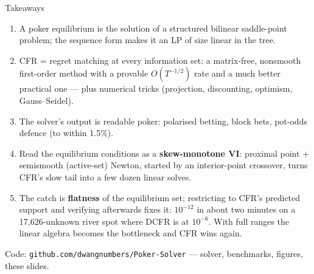\documentclass[10pt,aspectratio=169]{beamer}
\begin{document}
\begin{frame}{Takeaways}
\begin{enumerate}\small\setlength\itemsep{3pt}
\item A poker equilibrium is the solution of a structured bilinear saddle-point problem; the sequence form makes it an LP of
      size linear in the tree.
\item CFR = regret matching at every information set: a matrix-free, nonsmooth first-order method with a provable $O(T^{-1/2})$
      rate and a much better practical one --- plus numerical tricks (projection, discounting, optimism, Gauss--Seidel).
\item The solver's output is readable poker: polarised betting, block bets, pot-odds defence (to within 1.5\%).
\item Read the equilibrium conditions as a \textbf{skew-monotone VI}: proximal point $+$ semismooth (active-set) Newton,
      started by an interior-point crossover, turns CFR's slow tail into a few dozen linear solves.
\item The catch is \textbf{flatness} of the equilibrium set; restricting to CFR's predicted support and verifying
      afterwards fixes it: $10^{-12}$ in about two minutes on a 17{,}626-unknown river spot where DCFR is at $10^{-6}$.
      With full ranges the linear algebra becomes the bottleneck and CFR wins again.
\end{enumerate}
\vspace{2pt}
{\small Code: \texttt{github.com/dwangnumbers/Poker-Solver} --- solver, benchmarks, figures, these slides.}
\end{frame}
\end{document}
